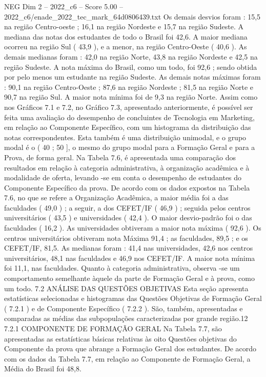 \begin{textsample}{NEG Dim 2 – 2022\_c6 – Score 5.00 – 2022\_c6/enade\_2022\_tec\_mark\_64d0806439.txt}
Os demais desvios foram : 15,5 na região Centro-oeste ; 16,1 na região Nordeste e 15,7 na região Sudeste.
A mediana das notas dos estudantes de todo o Brasil foi 42,6.
A maior mediana ocorreu na região Sul ( 43,9 ), e a menor, na região Centro-Oeste ( 40,6 ).
As demais medianas foram : 42,0 na região Norte, 43,8 na região Nordeste e 42,5 na região Sudeste.
A nota máxima do Brasil, como um todo, foi 92,6 ; sendo obtida por pelo menos um estudante na região Sudeste.
As demais notas máximas foram : 90,1 na região Centro-Oeste ; 87,6 na região Nordeste ; 81,5 na região Norte e 90,7 na região Sul.
A maior nota mínima foi de 9,3 na região Norte.
Assim como nos Gráficos 7.1 e 7.2, no Gráfico 7.3, apresentado anteriormente, é possível ser feita uma avaliação do desempenho de concluintes de Tecnologia em Marketing, em relação ao Componente Específico, com um histograma da distribuição das notas correspondentes.
Esta também é uma distribuição unimodal, e o grupo modal é o ( 40 ; 50 ], o mesmo do grupo modal para a Formação Geral e para a Prova, de forma geral.
Na Tabela 7.6, é apresentada uma comparação dos resultados em relação à categoria administrativa, à organização acadêmica e à modalidade de oferta, levando -se em conta o desempenho de estudantes do Componente Específico da prova.
De acordo com os dados expostos na Tabela 7.6, no que se refere a Organização Acadêmica, a maior média foi a das faculdades ( 49,0 ) ; a seguir, a dos CEFET/IF ( 46,9 ) ; seguida pelos centros universitários ( 43,5 ) e universidades ( 42,4 ).
O maior desvio-padrão foi o das faculdades ( 16,2 ).
As universidades obtiveram a maior nota máxima ( 92,6 ).
Os centros universitários obtiveram nota Máxima 91,4 ; as faculdades, 89,5 ; e os CEFET/IF, 81,5.
As medianas foram : 41,4 nas universidades, 42,6 nos centros universitários, 48,1 nas faculdades e 46,9 nos CEFET/IF.
A maior nota mínima foi 11,1, nas faculdades.
Quanto à categoria administrativa, observa -se um comportamento semelhante àquele da parte de Formação Geral e à prova, como um todo. 7.2 ANÁLISE DAS QUESTÕES OBJETIVAS Esta seção apresenta estatísticas selecionadas e histogramas das Questões Objetivas de Formação Geral ( 7.2.1 ) e de Componente Específico ( 7.2.2 ).
São, também, apresentadas e comparadas as médias das subpopulações caracterizadas por grande região.12 7.2.1 COMPONENTE DE FORMAÇÃO GERAL Na Tabela 7.7, são apresentadas as estatísticas básicas relativas às oito Questões objetivas do Componente da prova que abrange a Formação Geral dos estudantes.
De acordo com os dados da Tabela 7.7, em relação ao Componente de Formação Geral, a Média do Brasil foi 48,8.

\end{textsample}
